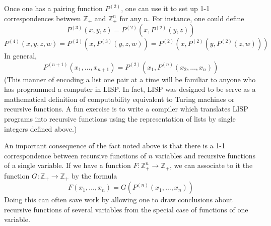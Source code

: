\documentclass[12pt]{article}
\begin{document}
Once one has a pairing function $P^{(2)}$, one can use it to set up 1-1 correspondences between $\mathbb{Z}_+$ and $\mathbb{Z}_+^n$ for any $n$.  For instance, one could define
 $$P^{(3)} (x,y,z) = P^{(2)} (x, P^{(2)}(y,z))$$
 $$P^{(4)} (x,y,z,w) = P^{(2)} (x, P^{(3)}(y,z,w)) = P^{(2)} (x,P^{(2)}(y, P^{(2)}(z,w)))$$
In general, 
 $$P^{(n+1)} (x_1, \ldots, x_{n+1}) = P^{(2)} (x_1, P^{(n)} (x_2, \ldots, x_n))$$
(This manner of encoding a list one pair at a time will be familiar to anyone who has programmed a computer in LISP.  In fact, LISP was designed to be serve as a mathematical definition of computability equivalent to Turing machines or recursive functions.  A fun exercise is to write a compiler which translates LISP programs into recursive functions using the representation of lists by single integers defined above.)

An important consequence of the fact noted above is that there is a 1-1 correspondence between recursive functions of $n$ variables and recursive functions of a single variable.  If we have a function $F \colon \mathbb{Z}_+^n \to \mathbb{Z}_+$, we can associate to it the function $G \colon \mathbb{Z}_+ \to \mathbb{Z}_+$ by the formula
 $$F(x_1, \ldots, x_n) = G( P^{(n)} (x_1, \ldots, x_n))$$
Doing this can often save work by allowing one to draw conclusions about recursive functions of
several variables from the special case of functions of one variable.

\end{document}

